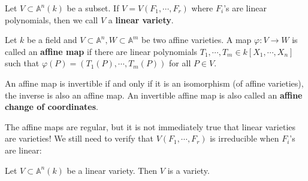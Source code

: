 \documentclass{note-eng}
\begin{document}
\begin{definition}
    Let $V \subset \mathbb{A}^n(k)$ be a subset. If $V = V(F_1, \cdots, F_r)$ where $F_i$'s are linear polynomials, then we call $V$ a \textbf{linear variety}.
\end{definition}

\begin{definition}
    Let $k$ be a field and $V \subset \mathbb{A}^n, W \subset \mathbb{A}^m$ be two affine varieties. A map $\varphi: V \rightarrow W$ is called an \textbf{affine map} if there are linear polynomials $T_1, \cdots, T_m \in k[X_1, \cdots, X_n]$ such that $\varphi(P) = (T_1(P), \cdots, T_m(P))$ for all $P \in V$.

    An affine map is invertible if and only if it is an isomorphism (of affine varieties), the inverse is also an affine map. An invertible affine map is also called an \textbf{affine change of coordinates}.
\end{definition}

The affine maps are regular, but it is not immediately true that linear varieties are varieties! We still need to verify that $V(F_1, \cdots, F_r)$ is irreducible when $F_i$'s are linear:

\begin{proposition}
    Let $V \subset \mathbb{A}^n(k)$ be a linear variety. Then $V$ is a variety.
\end{proposition}
\end{document}
